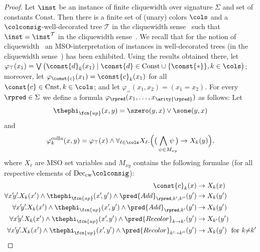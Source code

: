 \begin{proof}
	Let $\inst$ be an instance of finite cliquewidth over signature $\Sigma$ and set of constants $\mathrm{Const}$. Then there is a finite set of (unary) colors $\cols$ and a $\colconsig$-well-decorated tree $\mathcal{T}$ in the cliquewidth sense~\cite[Definition 6]{ICDT2023} such that $\inst = \inst^{\mathcal{T}}$ in the cliquewidth sense~\cite[Definition 7]{ICDT2023}.
	We recall that for the notion of cliquewidth~\cite[Definition 8]{ICDT2023} an MSO-interpretation of instances in well-decorated trees (in the cliquewidth sense~\cite[Definition 6]{ICDT2023}) has been exhibited.
	Using the results obtained there, let $\varphi_{\top}(x_1) = \bigvee \big(\const{d}_k(x_1) \mid \const{d} \in \mathrm{Const} \cup\{\const{*}\}, k \in \cols\big)$; moreover, let  $ \varphi_{\const{c}}(x_1) = \const{c}_{k}(x_1)$ for all $\const{c}\in\mathrm{Cnst}, k\in\cols$; and let $\varphi_{=}(x_1, x_2) = (x_1 = x_2)$.
	For every $\rpred\in \Sigma$ we define a formula $\varphi_{\rpred}(x_1,\ldots, x_{\arity{\rpred}})$ as follows: Let
    	$$
    	\thephi_\fcn{up}(x,y) = \szero(y,x) \vee \sone(y,x)
    	$$
    	and
    	$$
    	\varphi^\mathrm{colIn}_{k}(x,y) = \varphi_{\top}(x) \wedge 
    	\forall_{\ell \in \cols} X_\ell. 
    	\Big(\big(\hspace{-3ex} \bigwedge_{\hspace{3ex}\psi \in M_{xy}}\hspace{-3ex}\psi\, \big) \to X_k(y)\Big),
    	$$%
    	where $X_\ell$ are MSO set variables and $M_{xy}$ contains the following formulae (for all respective elements of $\mathrm{Dec}_{\mathrm{cw}}\colconsig$):
    	\begin{align*}
    		\const{c}_k(x) & \to X_{k}(x)\\ 
    		\forall x'\!y'\!. X_k(x') \wedge \thephi_\fcn{up}(x'\!,y') \wedge \pred{Add}_{\rpred,k',k''}(y') & \to X_{k}(y')\\ 
    		\forall x'\!y'\!. X_k(x') \wedge \thephi_\fcn{up}(x'\!,y') \wedge \pred{Add}_{\rpred,k'}(y') & \to X_{k}(y')\\ 
    		\forall x'\!y'\!. X_k(x') \wedge \thephi_\fcn{up}(x'\!,y') \wedge \pred{Recolor}_{k\to k'}(y') & \to X_{k'}(y')\\ 
    		\forall x'\!y'\!. X_k(x') \wedge \thephi_\fcn{up}(x'\!,y') \wedge \pred{Recolor}_{k'\!\to k''}(y') & \to X_{k}(y')\hspace{1.5ex}\text{for }k{\neq} k'\\ 

\end{align*}
\end{proof}
